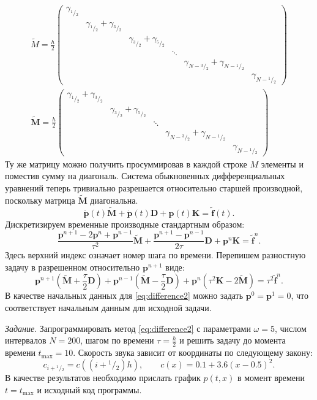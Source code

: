 \documentclass[12pt]{article}
\newcommand{\cutefrac}[2]{{}^{#1\!}\!/{\!}_#2}
\newcommand{\half}{\cutefrac{1}{2}}
\begin{document}
\begin{gather*}
\widetilde{M} = \frac{h}{2}
\begin{pmatrix}
\gamma_{\half} & \\
& \gamma_{\half} + \gamma_{\cutefrac{3}{2}}\\
& & \gamma_{\cutefrac{3}{2}} + \gamma_{\cutefrac{5}{2}}\\
& & & \ddots \\
& & & & \gamma_{N - \cutefrac{3}{2}} + \gamma_{N - \half}\\
& & & & & \gamma_{N-\half}
\end{pmatrix}
\\
\widetilde{\mathbf{M}} = \frac{h}{2}
\begin{pmatrix}
\gamma_{\half} + \gamma_{\cutefrac{3}{2}}\\
& \gamma_{\cutefrac{3}{2}} + \gamma_{\cutefrac{5}{2}}\\
& & \ddots \\
& & & \gamma_{N - \cutefrac{3}{2}} + \gamma_{N - \half}\\
& & & & \gamma_{N-\half}
\end{pmatrix}
\end{gather*}
Ту же матрицу можно получить просуммировав в каждой строке $M$ элементы и поместив
сумму на диагональ. Система обыкновенных дифференциальных уравнений теперь
тривиально разрешается относительно старшей производной, поскольку матрица
$\widetilde{\mathbf{M}}$ диагональна.
\begin{equation}
\ddot{\mathbf{p}}(t) \widetilde{\mathbf{M}} + \dot{\mathbf{p}}(t) \mathbf{D}
+ \mathbf{p}(t) \mathbf{K} = \widetilde{\mathbf{f}}(t).
\label{eq:vector2}
\end{equation}
Дискретизируем временные производные стандартным образом:
\begin{equation}
\frac{\mathbf{p}^{n+1} -2 \mathbf{p}^n + \mathbf{p}^{n-1}}{\tau^2}
\widetilde{\mathbf{M}}
+
\frac{\mathbf{p}^{n+1} - \mathbf{p}^{n-1}}{2\tau}
\mathbf{D}
+
\mathbf{p}^n \mathbf{K} = \widetilde{\mathbf{f}}^n.
\label{eq:difference}
\end{equation}
Здесь верхний индекс означает номер шага по времени. Перепишем разностную задачу
в разрешенном относительно $\mathbf{p}^{n+1}$ виде:
\begin{equation}
\mathbf{p}^{n+1} \left(
\widetilde{\mathbf{M}} + \frac{\tau}{2} \mathbf{D}
\right)
+
\mathbf{p}^{n-1} \left(
\widetilde{\mathbf{M}} - \frac{\tau}{2} \mathbf{D}
\right)
+
\mathbf{p}^n \left(
\tau^2\mathbf{K}-2\widetilde{\mathbf{M}}
\right)
 = \tau^2\widetilde{\mathbf{f}}^n.
\label{eq:difference2}
\end{equation}
В качестве начальных данных для \eqref{eq:difference2} можно задать
$\mathbf{p}^0 = \mathbf{p}^1 = 0$, что соответствует начальным данным для
исходной задачи. 

\emph{Задание}. Запрограммировать метод \eqref{eq:difference2} с параметрами 
$\omega = 5$, числом интервалов $N = 200$, шагом по времени $\tau = \frac{h}{2}$
и решить задачу до момента времени $t_{\max} = 10$. Скорость звука зависит от
координаты по следующему закону:
\[
c_{i+\half} = c\left( (i + \half) h\right), \qquad c(x) = 0.1 + 3.6 (x - 0.5)^2.
\]
В качестве результатов необходимо прислать график $p(t, x)$ в момент времени $t =
t_{\max}$ и исходный код программы.
\end{document}
